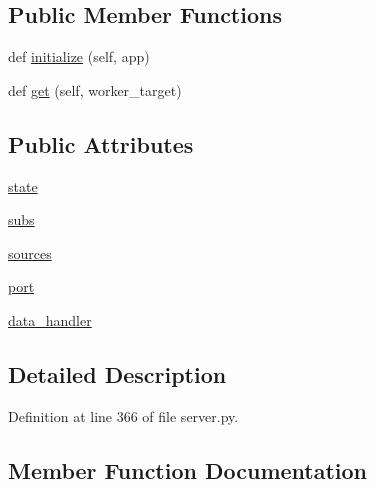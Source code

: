 \subsection*{Public Member Functions}
\begin{DoxyCompactItemize}
\item 
def \hyperlink{classparlai_1_1mturk_1_1webapp_1_1server_1_1WorkerHandler_a6e358648dc6628021fe6384d2741c2cc}{initialize} (self, app)
\item 
def \hyperlink{classparlai_1_1mturk_1_1webapp_1_1server_1_1WorkerHandler_ae2d5a8e9e7a62c96f5dd4b4c7cc3190e}{get} (self, worker\+\_\+target)
\end{DoxyCompactItemize}
\subsection*{Public Attributes}
\begin{DoxyCompactItemize}
\item 
\hyperlink{classparlai_1_1mturk_1_1webapp_1_1server_1_1WorkerHandler_af6f56f70aa5d37190629bb460f76f5bf}{state}
\item 
\hyperlink{classparlai_1_1mturk_1_1webapp_1_1server_1_1WorkerHandler_a688a67d4e6ea07a81ac7b122bd1c2c25}{subs}
\item 
\hyperlink{classparlai_1_1mturk_1_1webapp_1_1server_1_1WorkerHandler_a1ea89751b206df02f704b20ec39458ca}{sources}
\item 
\hyperlink{classparlai_1_1mturk_1_1webapp_1_1server_1_1WorkerHandler_aee8590b08e1a2011424d0145473f849e}{port}
\item 
\hyperlink{classparlai_1_1mturk_1_1webapp_1_1server_1_1WorkerHandler_ab9fd59301ef9d35ba692abdbb8e4b0b8}{data\+\_\+handler}
\end{DoxyCompactItemize}


\subsection{Detailed Description}


Definition at line 366 of file server.\+py.



\subsection{Member Function Documentation}
\mbox{\label{classparlai_1_1mturk_1_1webapp_1_1server_1_1WorkerHandler_ae2d5a8e9e7a62c96f5dd4b4c7cc3190e}} 
